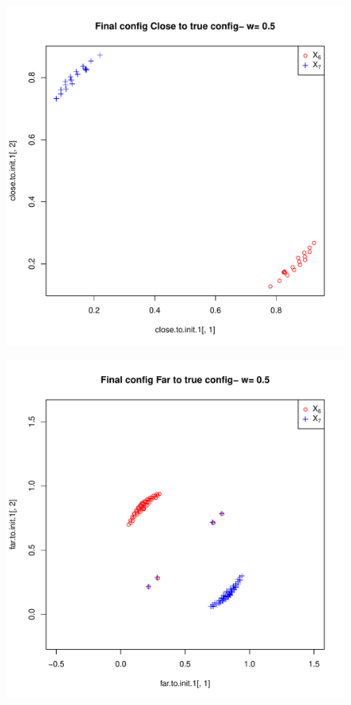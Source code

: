\documentclass[12pt,oneside,final]{thesis}\usepackage[]{graphicx}\usepackage[]{color}
\begin{document}
\begin{figure}
\begin{minipage}[b]{0.5\linewidth}
\centering
\includegraphics[scale=0.45]{true-min-w0_5}

\label{fig:Finalconfig-MultMin-w-0_5_a}

\end{minipage}
\hspace{0.5cm}
\begin{minipage}[b]{0.5\linewidth}
\centering
\includegraphics[scale=0.45]{other-min-w0_5.pdf}


\end{minipage}
\end{figure}
\end{document}
